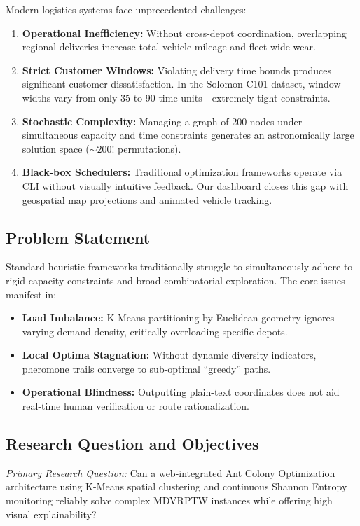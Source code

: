 \documentclass[10pt,conference]{IEEEtran}
\begin{document}
Modern logistics systems face unprecedented challenges:
\begin{enumerate}
    \item \textbf{Operational Inefficiency:} Without cross-depot coordination, overlapping regional deliveries increase total vehicle mileage and fleet-wide wear.
    \item \textbf{Strict Customer Windows:} Violating delivery time bounds produces significant customer dissatisfaction. In the Solomon C101 dataset, window widths vary from only 35 to 90 time units---extremely tight constraints.
    \item \textbf{Stochastic Complexity:} Managing a graph of 200 nodes under simultaneous capacity and time constraints generates an astronomically large solution space ($\sim 200!$ permutations).
    \item \textbf{Black-box Schedulers:} Traditional optimization frameworks operate via CLI without visually intuitive feedback. Our dashboard closes this gap with geospatial map projections and animated vehicle tracking.
\end{enumerate}

\subsection{Problem Statement}
Standard heuristic frameworks traditionally struggle to simultaneously adhere to rigid capacity constraints and broad combinatorial exploration. The core issues manifest in:
\begin{itemize}
    \item \textbf{Load Imbalance:} K-Means partitioning by Euclidean geometry ignores varying demand density, critically overloading specific depots.
    \item \textbf{Local Optima Stagnation:} Without dynamic diversity indicators, pheromone trails converge to sub-optimal ``greedy'' paths.
    \item \textbf{Operational Blindness:} Outputting plain-text coordinates does not aid real-time human verification or route rationalization.
\end{itemize}

\subsection{Research Question and Objectives}
\textit{Primary Research Question:} Can a web-integrated Ant Colony Optimization architecture using K-Means spatial clustering and continuous Shannon Entropy monitoring reliably solve complex MDVRPTW instances while offering high visual explainability?
\end{document}
